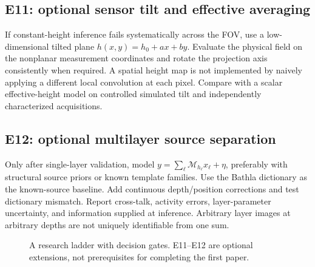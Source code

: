 \subsection{E11: optional sensor tilt and effective averaging}
If constant-height inference fails systematically across the FOV, use a low-dimensional tilted plane $h(x,y)=h_0+a x+b y$. Evaluate the physical field on the nonplanar measurement coordinates and rotate the projection axis consistently when required. A spatial height map is not implemented by naively applying a different local convolution at each pixel. Compare with a scalar effective-height model on controlled simulated tilt and independently characterized acquisitions.

\subsection{E12: optional multilayer source separation}
Only after single-layer validation, model $y=\sum_\ell\mathcal M_{h_\ell}x_\ell+\eta$, preferably with structural source priors or known template families. Use the Bathla dictionary as the known-source baseline. Add continuous depth/position corrections and test dictionary mismatch. Report cross-talk, activity errors, layer-parameter uncertainty, and information supplied at inference. Arbitrary layer images at arbitrary depths are not uniquely identifiable from one sum.

\begin{figure}[htbp]\centering
{}
\caption{A research ladder with decision gates. E11--E12 are optional extensions, not prerequisites for completing the first paper.}
\end{figure}

